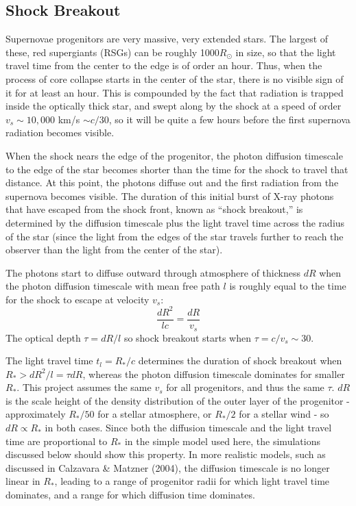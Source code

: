 \documentclass{amsart}
\begin{document}
\subsection{Shock Breakout}
Supernovae progenitors are very massive, very extended stars.  The largest
of these, red supergiants (RSGs) can be roughly 1000$R_\odot$ in size, so that the light travel time from the center to the edge is of order an hour.  
Thus, when the process of core collapse starts in the center of the star, there is no visible sign of it for at least an hour.  This is compounded by the fact that radiation is trapped inside the optically thick star, and swept along by the shock at a speed of order $v_s\sim10,000$ km/s $\sim c/30$, so it will be quite a few hours before the first supernova radiation becomes visible.

When the shock nears the edge of the progenitor, the photon diffusion timescale to the edge of the star becomes shorter than the time for the shock to travel that distance.
At this point, the photons diffuse out and the first radiation from the supernova becomes visible.  The duration of this initial burst of X-ray photons that have escaped from the shock front, known as ``shock breakout,'' is determined by the diffusion timescale plus the light travel time across the radius of the star (since the light from the edges of the star travels further to reach the observer than the light from the center of the star).

The photons start to diffuse outward through atmosphere of thickness $dR$ when the photon diffusion timescale with mean free path $l$ is roughly equal to the time for the shock to escape at velocity $v_s$:
\begin{equation}
	\frac{dR^2}{lc} = \frac{dR}{v_s}
\end{equation}
The optical depth $\tau=dR/l$ so shock breakout starts when
$\tau=c/v_s{\sim}30$.

The light travel time $t_l=R_*/c$ determines the duration of shock breakout when $R_*>dR^2/l=\tau{dR}$, whereas the photon diffusion timescale dominates for smaller $R_*$.  This project assumes the same $v_s$ for all progenitors,
and thus the same $\tau$.  $dR$ is the scale height of the density distribution of the outer layer of the progenitor - approximately $R_*/50$ for a stellar atmosphere, or $R_*/2$ for a stellar wind - so $dR{\propto}R_*$ in both cases.  Since both the diffusion timescale and the light travel time are proportional to $R_*$ in the simple model used here, the simulations discussed below should show this property.  In more realistic models, such as discussed in Calzavara \& Matzner (2004), the diffusion timescale is no longer linear in $R_*$, leading to a range of progenitor radii for which light travel time dominates, and a range for which diffusion time dominates.
\end{document}
